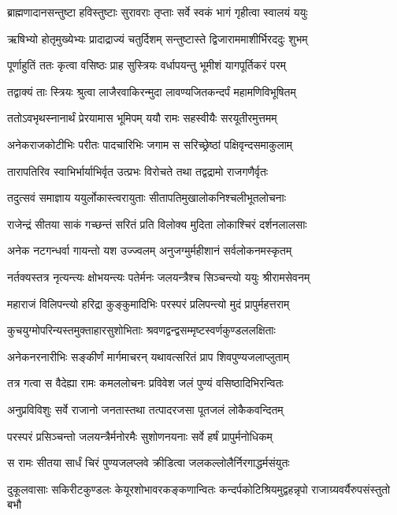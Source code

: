 \twolineshloka
{ब्राह्मणादानसन्तुष्टा हविस्तुष्टाः सुरावराः}
{तृप्ताः सर्वे स्वकं भागं गृहीत्वा स्वालयं ययुः}%

\twolineshloka
{ऋषिभ्यो होतृमुख्येभ्यः प्रादाद्राज्यं चतुर्दिशम्}
{सन्तुष्टास्ते द्विजाराममाशीर्भिरददुः शुभम्}%

\twolineshloka
{पूर्णाहुतिं ततः कृत्वा वसिष्ठः प्राह सुस्त्रियः}
{वर्धापयन्तु भूमीशं यागपूर्तिकरं परम्}%

\twolineshloka
{तद्वाक्यं ताः स्त्रियः श्रुत्वा लाजैरवाकिरन्मुदा}
{लावण्यजितकन्दर्पं महामणिविभूषितम्}%

\twolineshloka
{ततोऽवभृथस्नानार्थं प्रेरयामास भूमिपम्}
{ययौ रामः सहस्वीयैः सरयूतीरमुत्तमम्}%

\twolineshloka
{अनेकराजकोटीभिः परीतः पादचारिभिः}
{जगाम स सरिच्छ्रेष्ठां पक्षिवृन्दसमाकुलाम्}%

\twolineshloka
{तारापतिरिव स्वाभिर्भार्याभिर्वृत उत्प्रभः}
{विरोचते तथा तद्वद्रामो राजगणैर्वृतः}%

\twolineshloka
{तदुत्सवं समाज्ञाय ययुर्लोकास्त्वरायुताः}
{सीतापतिमुखालोकनिश्चलीभूतलोचनाः}%

\twolineshloka
{राजेन्द्रं सीतया साकं गच्छन्तं सरितं प्रति}
{विलोक्य मुदिता लोकाश्चिरं दर्शनलालसाः}%

\twolineshloka
{अनेक नटगन्धर्वा गायन्तो यश उज्ज्वलम्}
{अनुजग्मुर्महीशानं सर्वलोकनमस्कृतम्}%

\twolineshloka
{नर्तक्यस्तत्र नृत्यन्त्यः क्षोभयन्त्यः पतेर्मनः}
{जलयन्त्रैश्च सिञ्चन्त्यो ययुः श्रीरामसेवनम्}%

\twolineshloka
{महाराजं विलिपन्त्यो हरिद्रा कुङ्कुमादिभिः}
{परस्परं प्रलिपन्त्यो मुदं प्रापुर्महत्तराम्}%

\twolineshloka
{कुचयुग्मोपरिन्यस्तमुक्ताहारसुशोभिताः}
{श्रवणद्वन्द्वसम्मृष्टस्वर्णकुण्डललक्षिताः}%

\twolineshloka
{अनेकनरनारीभिः सङ्कीर्णं मार्गमाचरन्}
{यथावत्सरितं प्राप शिवपुण्यजलाप्लुताम्}%

\twolineshloka
{तत्र गत्वा स वैदेह्या रामः कमललोचनः}
{प्रविवेश जलं पुण्यं वसिष्ठादिभिरन्वितः}%

\twolineshloka
{अनुप्रविविशुः सर्वे राजानो जनतास्तथा}
{तत्पादरजसा पूतजलं लोकैकवन्दितम्}%

\twolineshloka
{परस्परं प्रसिञ्चन्तो जलयन्त्रैर्मनोरमैः}
{सुशोणनयनाः सर्वे हर्षं प्रापुर्मनोधिकम्}%

\twolineshloka
{स रामः सीतया सार्धं चिरं पुण्यजलप्लवे}
{क्रीडित्वा जलकल्लोलैर्निरगाद्धर्मसंयुतः}%

\twolineshloka
{दुकूलवासाः सकिरीटकुण्डलः केयूरशोभावरकङ्कणान्वितः}
{कन्दर्पकोटिश्रियमुद्वहन्नृपो राजाग्र्यवर्यैरुपसंस्तुतो बभौ}%

